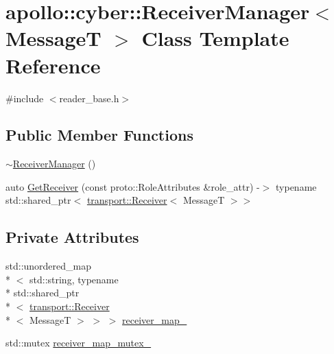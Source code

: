 \hypertarget{classapollo_1_1cyber_1_1ReceiverManager}{\section{apollo\-:\-:cyber\-:\-:Receiver\-Manager$<$ Message\-T $>$ Class Template Reference}
\label{classapollo_1_1cyber_1_1ReceiverManager}
}


{\ttfamily \#include $<$reader\-\_\-base.\-h$>$}

\subsection*{Public Member Functions}
\begin{DoxyCompactItemize}
\item 
\hyperlink{classapollo_1_1cyber_1_1ReceiverManager_a456021b6463afbe8535f80ca7a438589}{$\sim$\-Receiver\-Manager} ()
\item 
auto \hyperlink{classapollo_1_1cyber_1_1ReceiverManager_a06ac2c615eb75c3cbeb58e9af5d3730b}{Get\-Receiver} (const proto\-::\-Role\-Attributes \&role\-\_\-attr) -\/$>$ typename std\-::shared\-\_\-ptr$<$ \hyperlink{classapollo_1_1cyber_1_1transport_1_1Receiver}{transport\-::\-Receiver}$<$ Message\-T $>$$>$
\end{DoxyCompactItemize}
\subsection*{Private Attributes}
\begin{DoxyCompactItemize}
\item 
std\-::unordered\-\_\-map\\*
$<$ std\-::string, typename \\*
std\-::shared\-\_\-ptr\\*
$<$ \hyperlink{classapollo_1_1cyber_1_1transport_1_1Receiver}{transport\-::\-Receiver}\\*
$<$ Message\-T $>$ $>$ $>$ \hyperlink{classapollo_1_1cyber_1_1ReceiverManager_a14b14b40ce05bdc1677e7ff0d99b2c44}{receiver\-\_\-map\-\_\-}
\item 
std\-::mutex \hyperlink{classapollo_1_1cyber_1_1ReceiverManager_aec1d31290551f065d0af89d4a94f7c5c}{receiver\-\_\-map\-\_\-mutex\-\_\-}
\end{DoxyCompactItemize}



